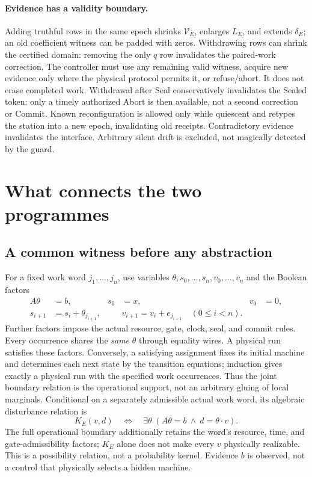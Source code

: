 \documentclass[11pt,a4paper]{article}
\theoremstyle{definition}
\newcommand{\V}{\mathcal V}
\begin{document}
\paragraph{Evidence has a validity boundary.}
Adding truthful rows in the same epoch shrinks $\V_E$, enlarges $L_E$, and
extends $\delta_E$; an old coefficient witness can be padded with zeros.
Withdrawing rows can shrink the certified domain: removing the only $q$
row invalidates the paired-work correction. The controller must use any
remaining valid witness, acquire new evidence only where the physical
protocol permits it, or refuse/abort. It does not erase completed work.
Withdrawal after Seal conservatively invalidates the Sealed token: only
a timely authorized Abort is then available, not a second correction or
Commit. Known reconfiguration is allowed only while quiescent and retypes
the station into a new epoch, invalidating old receipts. Contradictory evidence
invalidates the interface. Arbitrary silent drift is excluded, not magically
detected by the guard.


\section{What connects the two programmes}


\subsection{A common witness before any abstraction}

For a fixed work word $j_1,\ldots,j_n$, use variables
$\theta,s_0,\ldots,s_n,v_0,\ldots,v_n$ and the Boolean factors
\begin{align*}
 A\theta&=b,&s_0&=x,&v_0&=0,\\
 s_{i+1}&=s_i+\theta_{j_{i+1}},&&
 v_{i+1}=v_i+e_{j_{i+1}}\quad(0\le i<n).
\end{align*}
Further factors impose the actual resource, gate, clock, seal, and commit
rules. Every occurrence shares the \emph{same} $\theta$ through equality
wires. A physical run satisfies these factors. Conversely, a satisfying
assignment fixes its initial machine and determines each next state by the
transition equations; induction gives exactly a physical run with the
specified work occurrences. Thus the joint boundary relation is the
operational support, not an arbitrary gluing of local marginals.
Conditional on a separately admissible actual work word, its algebraic
disturbance relation is
\[
 K_E(v,d)\quad\Longleftrightarrow\quad
       \exists\theta\;(A\theta=b\ \land\ d=\theta\cdot v).
\]
The full operational boundary additionally retains the word's resource,
time, and gate-admissibility factors; $K_E$ alone does not make every $v$
physically realizable. This is a possibility relation, not a probability
kernel. Evidence $b$ is
observed, not a control that physically selects a hidden machine.
\end{document}
